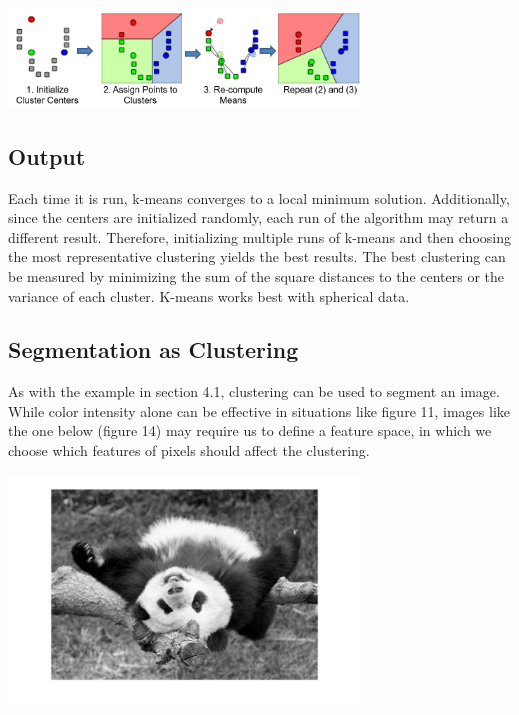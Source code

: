 \documentclass{article}
\begin{document}
\begin{minipage}{\linewidth}
\begin{center}
\includegraphics[width=0.70\textwidth]{k-means-algorithm.png}
\end{center}
\end{minipage}

\subsection{Output}
Each time it is run, k-means converges to a local minimum solution. Additionally, since the centers are initialized randomly, each run of the algorithm may return a different result. Therefore, initializing multiple runs of k-means and then choosing the most representative clustering yields the best results. The best clustering can be measured by minimizing the sum of the square distances to the centers or the variance of each cluster. K-means works best with spherical data.

\subsection{Segmentation as Clustering}
As with the example in section 4.1, clustering can be used to segment an image. While color intensity alone can be effective in situations like figure 11, images like the one below (figure 14) may require us to define a feature space, in which we choose which features of pixels should affect the clustering.

\begin{minipage}{\linewidth}
\begin{center}
\includegraphics[width=0.70\textwidth]{panda.jpg}
\end{center}
\end{minipage}
\end{document}
